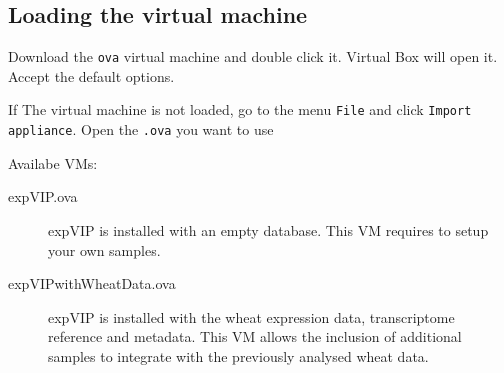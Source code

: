 \subsection{Loading the virtual
machine}\label{loading-the-virtual-machine}

Download the \lstinline!ova! virtual machine and double click it.
Virtual Box will open it. Accept the default options.

If The virtual machine is not loaded, go to the menu \lstinline!File!
and click \lstinline!Import appliance!. Open the \lstinline!.ova! you
want to use

Availabe VMs: 
\begin{description}
\item[expVIP.ova] expVIP is installed with an empty
database. This VM requires to setup your own samples. 

\item[expVIPwithWheatData.ova] expVIP is installed with the wheat
expression data, transcriptome reference and metadata. This VM allows
the inclusion of additional samples to integrate with the previously
analysed wheat data.
\end{description}

